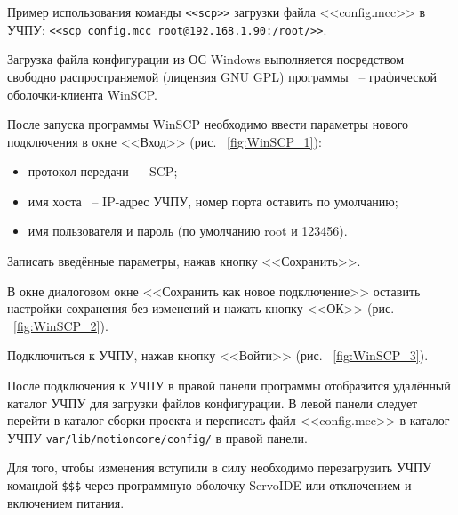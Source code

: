Пример использования команды \texttt{<<scp>>} загрузки файла <<config.mcc>> в УЧПУ: \newline \texttt{<<scp config.mcc root@192.168.1.90:/root/>>}. \killoverfullbefore \BL

Загрузка файла конфигурации из ОС Windows выполняется посредством свободно распространяемой (лицензия GNU GPL) программы ~-- графической оболочки-клиента WinSCP. \killoverfullbefore 


После запуска программы WinSCP необходимо ввести параметры нового подключения в окне <<Вход>> (рис. ~\ref{fig:WinSCP_1}):
\begin{itemize}
\item протокол передачи ~-- SCP;
\item имя хоста ~-- IP-адрес УЧПУ, номер порта оставить по умолчанию;
\item имя пользователя и пароль (по умолчанию root и 123456). \killoverfullbefore \BL
\end{itemize}


Записать введённые параметры, нажав кнопку <<Сохранить>>. 

В окне диалоговом окне <<Сохранить как новое подключение>> оставить настройки сохранения без изменений и нажать кнопку <<ОК>> (рис. ~\ref{fig:WinSCP_2}).


Подключиться к УЧПУ, нажав кнопку <<Войти>> (рис. ~\ref{fig:WinSCP_3}).


После подключения к УЧПУ в правой панели программы отобразится удалённый каталог УЧПУ для загрузки файлов конфигурации. В левой панели следует перейти в каталог сборки проекта и переписать файл <<config.mcc>> в каталог УЧПУ \texttt{var/lib/motioncore/config/} в правой панели.\killoverfullbefore


Для того, чтобы изменения вступили в силу необходимо перезагрузить УЧПУ командой \texttt{\$\$\$} через программную оболочку ServoIDE или отключением и включением питания.\killoverfullbefore


\clearpage